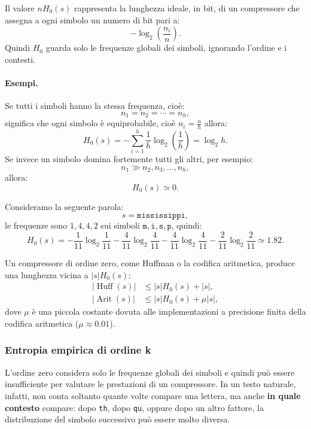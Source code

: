 \documentclass{article}
\theoremstyle{definition}
\numberwithin{equation}{section}
\begin{document}
Il valore $nH_0(s)$ rappresenta la lunghezza ideale, in bit, di un compressore che assegna a ogni simbolo un numero di bit pari a:
\[
    -\log_2\left(\frac{n_i}{n}\right).
\]
Quindi $H_0$ guarda solo le frequenze globali dei simboli, ignorando l'ordine e i contesti.

\paragraph{Esempi.}
Se tutti i simboli hanno la stessa frequenza, cioè:
\[
    n_1=n_2=\cdots=n_h,
\]
significa che ogni simbolo è equiprobabile, cioè $n_i = \frac{n}{h}$ allora:
\[
    H_0(s) =-\sum_{i=1}^{h}\frac{1}{h}\log_2\left(\frac{1}{h}\right)
    =\log_2 h.
\]
Se invece un simbolo domina fortemente tutti gli altri, per esempio:
\[
    n_1\gg n_2,n_3,\ldots,n_h,
\]
allora:
\[
    H_0(s)\simeq 0.
\]

Consideramo la seguente parola:
\[
    s=\texttt{mississippi},
\]
le frequenze sono $1,4,4,2$ sui simboli $\texttt{m},\texttt{i},\texttt{s},\texttt{p}$, quindi:
\[
    H_0(s)
    =
    -\frac{1}{11}\log_2\frac{1}{11}
    -\frac{4}{11}\log_2\frac{4}{11}
    -\frac{4}{11}\log_2\frac{4}{11}
    -\frac{2}{11}\log_2\frac{2}{11}
    \simeq 1.82.
\]

Un compressore di ordine zero, come Huffman o la codifica aritmetica, produce una lunghezza vicina a $|s|H_0(s)$:
\begin{align}
    |\operatorname{Huff}(s)|
     & \leq |s|H_0(s)+|s|,
    \label{eq:huffman_zero_order_bound} \\
    |\operatorname{Arit}(s)|
     & \leq |s|H_0(s)+\mu |s|,
    \label{eq:arithmetic_zero_order_bound}
\end{align}
dove $\mu$ è una piccola costante dovuta alle implementazioni a precisione finita della codifica aritmetica ($\mu\approx0.01$).

\subsubsection{Entropia empirica di ordine k}
L'ordine zero considera solo le frequenze globali dei simboli e quindi può essere insufficiente per valutare le prestazioni di un compressore. In un testo naturale, infatti, non conta soltanto quante volte compare una lettera, ma anche \textbf{in quale contesto} compare: dopo \texttt{th}, dopo \texttt{qu}, oppure dopo un altro fattore, la distribuzione del simbolo successivo può essere molto diversa.
\end{document}
